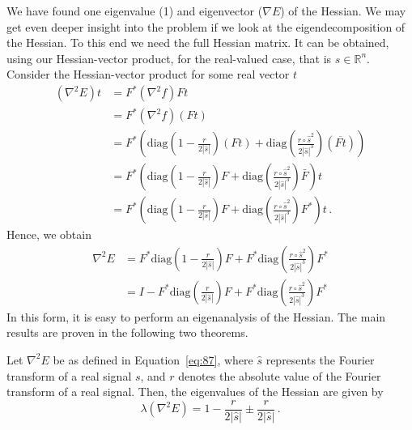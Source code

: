 We have found one eigenvalue (1) and eigenvector ($\nabla E$) of the
Hessian.  We may get even deeper insight into the problem if we
look at the eigendecomposition of the Hessian. To this end we need the
full Hessian matrix. It can be obtained, using our Hessian-vector
product,  for the real-valued
case, that is $s\in\mathbb R^{n}$. Consider the Hessian-vector product for some real vector $t$
\begin{equation}
  \label{eq:86}
  \begin{split}
    (\nabla^{2}E)t
    & = F^{*}(\nabla^{2}f)Ft\\
    & = F^{*}(\nabla^{2}f)(Ft)\\
    & = F^{*}
    \left(
      \mathrm{diag}
      \left(
        1 - \frac{r}{2|\hat{s}|}
      \right) (Ft)
      +
      \mathrm{diag}
      \left(
        \frac{r\circ \hat{s}^{2}}{2|\hat{s}|^{3}} 
      \right)
      \left(
        \overline{Ft}
      \right)
    \right)\\
    & =  F^{*}
    \left(
      \mathrm{diag}
      \left(
        1 - \frac{r}{2|\hat{s}|}
      \right) F
      +
      \mathrm{diag}
      \left(
        \frac{r\circ \hat{s}^{2}}{2|\hat{s}|^{3}} 
      \right)
      \bar F
    \right) t \\
    & =  F^{*}
    \left(
      \mathrm{diag}
      \left(
        1 - \frac{r}{2|\hat{s}|}
      \right) F
      +
      \mathrm{diag}
      \left(
        \frac{r\circ \hat{s}^{2}}{2|\hat{s}|^{3}} 
      \right)
      F^{*}
    \right) t \,.
  \end{split}
\end{equation}
Hence, we obtain
\begin{equation}
  \label{eq:87}
  \begin{split}
    \nabla^{2}E
    & =
    F^{*}\mathrm{diag}\left(1 - \frac{r}{2|\hat{s}|}\right) F
    + 
    F^{*}\mathrm{diag}\left(\frac{r\circ \hat{s}^{2}}{2|\hat{s}|^{3}}\right)F^{*}
    \\
    & = I -  F^{*}\mathrm{diag}\left(\frac{r}{2|\hat{s}|}\right) F
    +
    F^{*}\mathrm{diag}\left(\frac{r\circ \hat{s}^{2}}{2|\hat{s}|^{3}}\right)F^{*}
\end{split}
\end{equation}
In this form, it is easy to perform an eigenanalysis of the Hessian. The
main results are proven in the following two theorems.
\begin{thm}
  \label{thm:hessian-eigenvalues}
  Let $\nabla^{2} E$ be as defined in Equation~\eqref{eq:87}, where
  $\hat{s}$ represents the Fourier transform of a real signal $s$, and $r$ denotes
  the absolute value of the Fourier transform of a real signal. Then, the
  eigenvalues of the Hessian are given by
  \begin{equation}
    \label{eq:88}
    \lambda(\nabla^{2}E) = 1 - \frac{r}{2|\hat{s}|} \pm \frac{r}{2|\hat{s}|} \,.
  \end{equation}
\end{thm}

